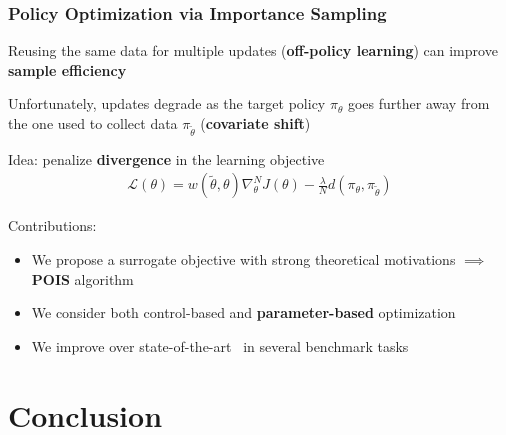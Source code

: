 \documentclass{beamer}
\begin{document}
\begin{frame}
\frametitle{Policy Optimization via Importance Sampling}
Reusing the same data for multiple updates (\textbf{off-policy learning}) can improve \textbf{sample efficiency}

\vfill

Unfortunately, updates degrade as the target policy $\pi_{\theta}$ goes further away from the one used to collect data $\pi_{\tilde{\theta}}$ (\textbf{covariate shift})

\vfill

Idea: penalize \textbf{divergence} in the learning objective
\begin{align*}
	\mathcal{L}(\theta) = w(\widetilde{\theta},\theta)\nabla_{\theta}^NJ(\theta) - \frac{\lambda}{N}d(\pi_{\theta}, \pi_{\tilde{\theta}})
\end{align*}

Contributions:
\begin{itemize}
	\item We propose a surrogate objective with strong theoretical motivations $\implies$ \textbf{POIS} algorithm
	\item We consider both control-based and \textbf{parameter-based} optimization
	\item We improve over state-of-the-art~\cite{schulman2015trust} in several benchmark tasks
\end{itemize}

\end{frame}

\section{Conclusion}
\end{document}
